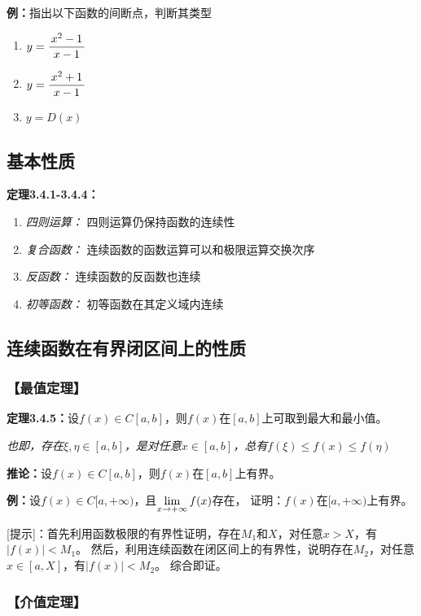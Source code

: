 {\bf 例：}指出以下函数的间断点，判断其类型
\begin{enumerate}[(1)]
  \setlength{\itemindent}{1cm}
  \item $y=\displaystyle\frac{\,{x^2-1}\,}{\,{x-1}\,}$
  \item $y=\displaystyle\frac{\,{x^2+1}\,}{\,{x-1}\,}$
  \item $y=D(x)$
\end{enumerate}

\subsection{基本性质}

{\bf 定理3.4.1-3.4.4：}
\begin{enumerate}[(1)]
  \setlength{\itemindent}{1cm}
  \item {\it 四则运算：} 四则运算仍保持函数的连续性 
  \item {\it 复合函数：} 连续函数的函数运算可以和极限运算交换次序 
  \item {\it 反函数：} 连续函数的反函数也连续 
  \item {\it 初等函数：} 初等函数在其定义域内连续
\end{enumerate}

\subsection{连续函数在有界闭区间上的性质}

\subsubsection{【最值定理】}

{\bf 定理3.4.5：}设$f(x)\in C[a,b]$，则$f(x)$在$[a,b]$上可取到最大和最小值。

{\it 也即，存在$\xi,\eta\in[a,b]$，是对任意$x\in[a,b]$，总有$f(\xi)
\leq f(x)\leq f(\eta)$}

{\bf 推论：}设$f(x)\in C[a,b]$，则$f(x)$在$[a,b]$上有界。

{\bf 例：}设$f(x)\in C[a,+\infty)$，且$\lim\limits_{x\to{+\infty}}f(x)$存在，
证明：$f(x)$在$[a,+\infty)$上有界。

[提示]：首先利用函数极限的有界性证明，存在$M_1$和$X$，对任意$x>X$，有$|f(x)|<M_1$。
然后，利用连续函数在闭区间上的有界性，说明存在$M_2$，对任意$x\in[a,X]$，有$|f(x)|<M_2$。
综合即证。

\subsubsection{【介值定理】}

